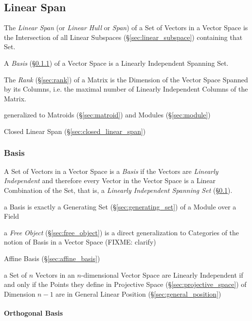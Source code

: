 \subsection{Linear Span}\label{sec:linear_span}

The \emph{Linear Span} (or \emph{Linear Hull} or \emph{Span}) of a Set of
Vectors in a Vector Space is the Intersection of all Linear Subspaces
(\S\ref{sec:linear_subspace}) containing that Set.

A \emph{Basis} (\S\ref{sec:basis}) of a Vector Space is a Linearly Independent
Spanning Set.

The \emph{Rank} (\S\ref{sec:rank}) of a Matrix is the Dimension of the Vector
Space Spanned by its Columns, i.e. the maximal number of Linearly Independent
Columns of the Matrix.

generalized to Matroids (\S\ref{sec:matroid}) and Modules (\S\ref{sec:module})

Closed Linear Span (\S\ref{sec:closed_linear_span})



\subsubsection{Basis}\label{sec:basis}

A Set of Vectors in a Vector Space is a \emph{Basis} if the Vectors are
\emph{Linearly Independent} and therefore every Vector in the Vector Space is a
Linear Combination of the Set, that is, a \emph{Linearly Independent Spanning
  Set} (\S\ref{sec:linear_span}).

a Basis is exactly a Generating Set (\S\ref{sec:generating_set}) of a Module
over a Field

\fist a \emph{Free Object} (\S\ref{sec:free_object}) is a direct generalization
to Categories of the notion of Basis in a Vector Space
(FIXME: clarify)

\fist Affine Basis (\S\ref{sec:affine_basis})

a Set of $n$ Vectors in an $n$-dimensional Vector Space are Linearly
Independent if and only if the Points they define in Projective Space
(\S\ref{sec:projective_space}) of Dimension $n-1$ are in General Linear
Position (\S\ref{sec:general_position})



\paragraph{Orthogonal Basis}\label{sec:orthogonal_basis}\hfill

